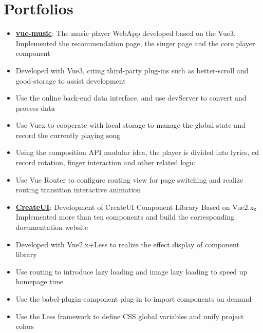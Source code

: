 \documentclass{resume}
\newcommand{\en}[1]{#1}
\newcommand{\zh}[1]{}
\begin{document}
\section{\en{Portfolios}\zh{个人项目}}
\begin{itemize}[parsep=0.25ex]
      \item \textbf{\href{https://github.com/MrEphemera/vue-music}{vue-music}}:
            \en{The music player WebApp developed based on the Vue3.
                Implemented the recommendation page, the singer page and the core player component
            }
            \zh{基于Vue3全家桶开发的音乐播放器WebApp，
                实现了推荐页面，歌手页面以及内核的播放器组件}
       \item 
            \en{Developed with Vue3, citing third-party plug-ins such as better-scroll and good-storage to assist development}
            \zh{使用上线的后端数据接口，采用devServer对数据进行转换与处理  }
       \item 
            \en{Use the online back-end data interface, and use devServer to convert and process data}
            \zh{采用Vue3开发，引用better-scroll，good-storage等第三方插件辅助开发 }
       \item 
            \en{Use Vuex to cooperate with local storage to manage the global state and record the currently playing song}
            \zh{采用Vuex配合本地存储管理全局状态，记录当前播放的歌曲}
      \item 
            \en{Using the composition API modular idea, the player is divided into lyrics, cd record rotation, finger interaction and other related logic}
            \zh{采用CompositionAPI模块化思想，将播放器分为歌词、cd 唱片旋转、手指交互等相关逻辑 }
      \item 
            \en{Use Vue Router to configure routing view for page switching and realize routing transition interactive animation}
            \zh{采用Vue Router配置路由视图进行页面切换和实现路由过渡交互动画  }

            
      \item \textbf{\href{https://github.com/MrEphemera/CreateUI}{CreateUI}}:
            \en{Development of CreateUI Component Library Based on Vue2.x。
                Implemented more than ten components and build the corresponding documentation website
            }
            \zh{基于Vue2.x的CreateUI组件库开发，
                实现10+组件，并搭建相应的文档网站}
      \item 
            \en{Developed with Vue2.x+Less to realize the effect display of component library}
            \zh{采用Vue2.x+Less开发，实现组件库效果展示 }
      \item 
            \en{Use routing to introduce lazy loading and image lazy loading to speed up homepage time}
            \zh{采用路由引入懒加载方式和图片懒加载，加快首页时间}
      \item 
            \en{Use the babel-plugin-component plug-in to import components on demand}
            \zh{采用babel-plugin-component插件实现组件按需引入}
      \item 
            \en{Use the Less framework to define CSS global variables and unify project colors}
            \zh{采用Less框架定义CSS全局变量，统一项目色彩}
    
\end{itemize}
\end{document}
